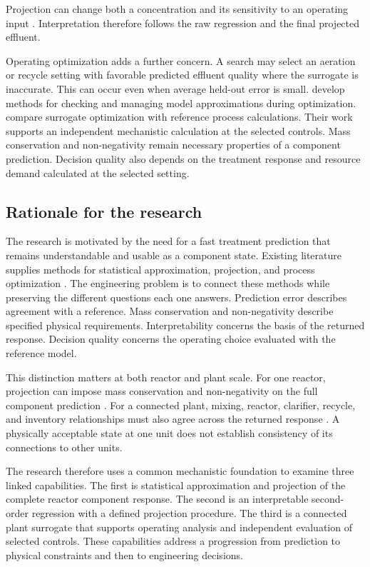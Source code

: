 Projection can change both a concentration and its sensitivity to an operating input \citep{Selerio2026}. Interpretation therefore follows the raw regression and the final projected effluent.

Operating optimization adds a further concern. A search may select an aeration or recycle setting with favorable predicted effluent quality where the surrogate is inaccurate. This can occur even when average held-out error is small. \citet{Alexandrov1998} develop methods for checking and managing model approximations during optimization. \citet{Pedrozo2025} compare surrogate optimization with reference process calculations. Their work supports an independent mechanistic calculation at the selected controls. Mass conservation and non-negativity remain necessary properties of a component prediction. Decision quality also depends on the treatment response and resource demand calculated at the selected setting.

\subsection{Rationale for the research}

The research is motivated by the need for a fast treatment prediction that remains understandable and usable as a component state. Existing literature supplies methods for statistical approximation, projection, and process optimization \citep{BhosekarIerapetritou2018,KircherVotsmeier2025,Durkin2024}. The engineering problem is to connect these methods while preserving the different questions each one answers. Prediction error describes agreement with a reference. Mass conservation and non-negativity describe specified physical requirements. Interpretability concerns the basis of the returned response. Decision quality concerns the operating choice evaluated with the reference model.

This distinction matters at both reactor and plant scale. For one reactor, projection can impose mass conservation and non-negativity on the full component prediction \citep{Selerio2026}. For a connected plant, mixing, reactor, clarifier, recycle, and inventory relationships must also agree across the returned response \citep{Alex2008,JeppssonDiehl1996}. A physically acceptable state at one unit does not establish consistency of its connections to other units.

The research therefore uses a common mechanistic foundation to examine three linked capabilities. The first is statistical approximation and projection of the complete reactor component response. The second is an interpretable second-order regression with a defined projection procedure. The third is a connected plant surrogate that supports operating analysis and independent evaluation of selected controls. These capabilities address a progression from prediction to physical constraints and then to engineering decisions.

